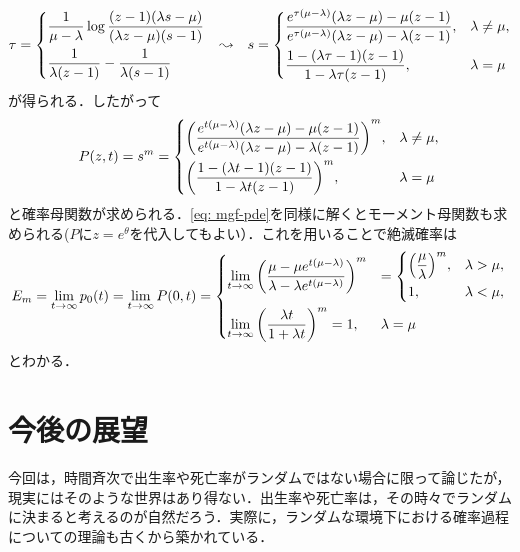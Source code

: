 \documentclass[dvipdfmx]{jsarticle}
\numberwithin{equation}{section}
\theoremstyle{definition}
\newcommand{\0}{\bm{0}}
\newcommand{\1}{\bm{1}}
\begin{document}
\begin{align}
  \tau = \begin{dcases}
    \frac{1}{\mu - \lambda} \log \frac{(z-1) (\lambda s - \mu)}{(\lambda z - \mu) (s-1)} \\
    \frac{1}{\lambda (z-1)} - \frac{1}{\lambda(s-1)}
  \end{dcases} && \leadsto && 
  s = \begin{dcases}
    \frac{e^{\tau (\mu - \lambda)} (\lambda z - \mu) - \mu (z-1)}{e^{\tau (\mu - \lambda)} (\lambda z - \mu) - \lambda (z-1)}, & \lambda \ne \mu, \\
    \frac{1 -(\lambda \tau - 1) (z-1)}{1 -\lambda \tau (z-1)}, & \lambda = \mu
  \end{dcases}  
\end{align}
が得られる．したがって
\begin{align}
  P(z,t) = s^m = \begin{dcases}
    \qty( \frac{e^{t (\mu - \lambda)} (\lambda z - \mu) - \mu (z-1)}{e^{t (\mu - \lambda)} (\lambda z - \mu) - \lambda(z-1)} )^m, & \lambda \ne \mu, \\
    \qty( \frac{1 - (\lambda t-1) (z-1)}{1 -\lambda t (z-1)} )^m, & \lambda = \mu
  \end{dcases}
\end{align}
と確率母関数が求められる．\eqref{eq: mgf-pde}を同様に解くとモーメント母関数も求められる($P$に$z = e^{\theta}$を代入してもよい）．これを用いることで絶滅確率は
\begin{align}
  E_m = \lim_{t \to \infty} p_0(t) = \lim_{t \to \infty} P(0,t) = \begin{dcases}
    \lim_{t \to \infty} \qty( \frac{\mu - \mu e^{t (\mu - \lambda)}}{\lambda - \lambda e^{t (\mu - \lambda)}} )^m 
    & = \begin{dcases}
      \qty( \frac{\mu}{\lambda} )^m, & \lambda > \mu, \\
      1, & \lambda < \mu, 
    \end{dcases} \\
    \lim_{t \to \infty} \qty( \frac{\lambda t}{1 + \lambda t})^m = 1, & \lambda = \mu
  \end{dcases}  
\end{align}
とわかる．

\section{今後の展望}
今回は，時間斉次で出生率や死亡率がランダムではない場合に限って論じたが，現実にはそのような世界はあり得ない．出生率や死亡率は，その時々でランダムに決まると考えるのが自然だろう．実際に，ランダムな環境下における確率過程についての理論も古くから築かれている．
\end{document}

